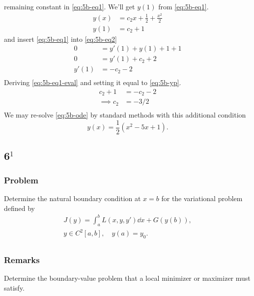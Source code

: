 \documentclass[12pt,twoside]{article}
\begin{document}
remaining constant in \cref{eq:5b-eq1}. We'll get $y(1)$ from \cref{eq:5b-eq1}.
\begin{equation}
  \label{eq:5b-eq1-eval}
  \begin{aligned}
    y(x) &= c_2x + \frac{1}{2} + \frac{x^2}{2} \\
    y(1) &= c_2 + 1
  \end{aligned}
\end{equation}
and insert \cref{eq:5b-eq1} into \cref{eq:5b-eq2}
\begin{equation}
  \label{eq:5b-yp}
  \begin{aligned}
    0 &= y'(1) + y(1) + 1  + 1 \\
    0 &= y'(1) + c_2 + 2 \\
    y'(1) &= -c_2 - 2 \\
  \end{aligned}
\end{equation}
Deriving \cref{eq:5b-eq1-eval} and setting it equal to \cref{eq:5b-yp}.
\begin{equation*}
  \begin{aligned}
    c_2 + 1 &= -c_2 - 2 \\
    \implies c_2 &= -3/2 \\
  \end{aligned}
\end{equation*}
We may re-solve \cref{eq:5b-ode} by standard methods with this additional condition
\begin{equation*}
\boxed{y(x) = \frac{1}{2} \left(x^2-5 x+1\right).}
\end{equation*}

\subsection{6$^1$}
\subsubsection*{Problem}
Determine the natural boundary condition at $x=b$ for the variational problem
defined by
\begin{equation}
  \begin{aligned}
    J(y) = \int_a^b L(x,y,y')\dd{x}+G(y(b)), \\
    y\in C^2[a,b],\quad y(a)=y_0. \\
  \end{aligned}
\end{equation}
\subsubsection*{Remarks}
Determine the boundary-value problem that a local minimizer or maximizer must
satisfy.
\end{document}
